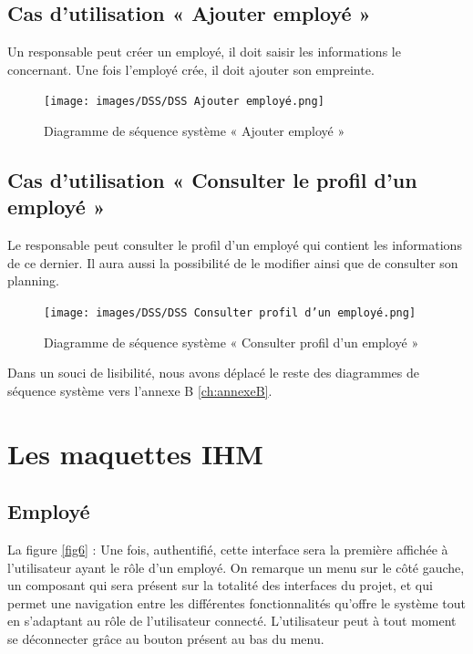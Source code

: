 \subsection{Cas d'utilisation « Ajouter employé »}
Un responsable peut créer un employé, il doit saisir les informations le
concernant. Une fois l’employé crée, il doit ajouter son empreinte.   

\clearpage
\begin{figure}[h!]
     \centering
    \texttt{[image: images/DSS/DSS Ajouter employé.png]}
     \caption{Diagramme de séquence système « Ajouter employé »}
     \label{fig4}
\end{figure}

\subsection{Cas d'utilisation « Consulter le profil d'un employé »}
Le responsable peut consulter le profil d’un employé qui contient les
informations de ce dernier. Il aura aussi la possibilité de le modifier ainsi
que de consulter son planning.

\clearpage
\begin{figure}[h!]
     \centering
    \texttt{[image: images/DSS/DSS Consulter profil d'un employé.png]}
     \caption{Diagramme de séquence système « Consulter profil d'un employé »}
     \label{fig4}
\end{figure}

Dans un souci de lisibilité, nous avons déplacé le reste des diagrammes de
séquence système vers l’annexe B \ref{ch:annexeB}.  
    
\section{Les maquettes IHM }
    
\subsection{Employé}
La figure \ref{fig6} : Une fois, authentifié, cette interface sera la première
affichée à l’utilisateur ayant le rôle d’un employé. On remarque un menu sur le
côté gauche, un composant qui sera présent sur la totalité des interfaces du
projet, et qui permet une navigation entre les différentes fonctionnalités
qu’offre le système tout en s’adaptant au rôle de l’utilisateur connecté.
L’utilisateur peut à tout moment se déconnecter grâce au bouton présent au bas
du menu.

